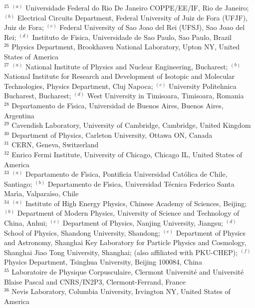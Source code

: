 \begin{flushleft}
$^{25}$ $^{(a)}$ Universidade Federal do Rio De Janeiro COPPE/EE/IF, Rio de Janeiro; $^{(b)}$ Electrical Circuits Department, Federal University of Juiz de Fora (UFJF), Juiz de Fora; $^{(c)}$ Federal University of Sao Joao del Rei (UFSJ), Sao Joao del Rei; $^{(d)}$ Instituto de Fisica, Universidade de Sao Paulo, Sao Paulo, Brazil\\
$^{26}$ Physics Department, Brookhaven National Laboratory, Upton NY, United States of America\\
$^{27}$ $^{(a)}$ National Institute of Physics and Nuclear Engineering, Bucharest; $^{(b)}$ National Institute for Research and Development of Isotopic and Molecular Technologies, Physics Department, Cluj Napoca; $^{(c)}$ University Politehnica Bucharest, Bucharest; $^{(d)}$ West University in Timisoara, Timisoara, Romania\\
$^{28}$ Departamento de F{\'\i}sica, Universidad de Buenos Aires, Buenos Aires, Argentina\\
$^{29}$ Cavendish Laboratory, University of Cambridge, Cambridge, United Kingdom\\
$^{30}$ Department of Physics, Carleton University, Ottawa ON, Canada\\
$^{31}$ CERN, Geneva, Switzerland\\
$^{32}$ Enrico Fermi Institute, University of Chicago, Chicago IL, United States of America\\
$^{33}$ $^{(a)}$ Departamento de F{\'\i}sica, Pontificia Universidad Cat{\'o}lica de Chile, Santiago; $^{(b)}$ Departamento de F{\'\i}sica, Universidad T{\'e}cnica Federico Santa Mar{\'\i}a, Valpara{\'\i}so, Chile\\
$^{34}$ $^{(a)}$ Institute of High Energy Physics, Chinese Academy of Sciences, Beijing; $^{(b)}$ Department of Modern Physics, University of Science and Technology of China, Anhui; $^{(c)}$ Department of Physics, Nanjing University, Jiangsu; $^{(d)}$ School of Physics, Shandong University, Shandong; $^{(e)}$ Department of Physics and Astronomy, Shanghai Key Laboratory for  Particle Physics and Cosmology, Shanghai Jiao Tong University, Shanghai; (also affiliated with PKU-CHEP); $^{(f)}$ Physics Department, Tsinghua University, Beijing 100084, China\\
$^{35}$ Laboratoire de Physique Corpusculaire, Clermont Universit{\'e} and Universit{\'e} Blaise Pascal and CNRS/IN2P3, Clermont-Ferrand, France\\
$^{36}$ Nevis Laboratory, Columbia University, Irvington NY, United States of America\\

\end{flushleft}
